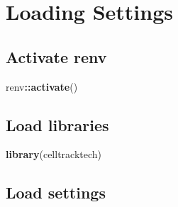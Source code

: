\documentclass[
]{book}
\newenvironment{Shaded}{\begin{snugshade}}{\end{snugshade}}
\newcommand{\FunctionTok}[1]{\textcolor[rgb]{0.13,0.29,0.53}{\textbf{#1}}}
\newcommand{\NormalTok}[1]{#1}
\newcommand{\SpecialCharTok}[1]{\textcolor[rgb]{0.81,0.36,0.00}{\textbf{#1}}}
\begin{document}
\section{Loading Settings}\label{loading-settings}

\subsection{Activate renv}\label{activate-renv-1}

\begin{Shaded}
\begin{Highlighting}[]
\NormalTok{renv}\SpecialCharTok{::}\FunctionTok{activate}\NormalTok{()}
\end{Highlighting}
\end{Shaded}

\subsection{Load libraries}\label{load-libraries}

\begin{Shaded}
\begin{Highlighting}[]
\FunctionTok{library}\NormalTok{(celltracktech)}
\end{Highlighting}
\end{Shaded}

\subsection{Load settings}\label{load-settings-3}
\end{document}
